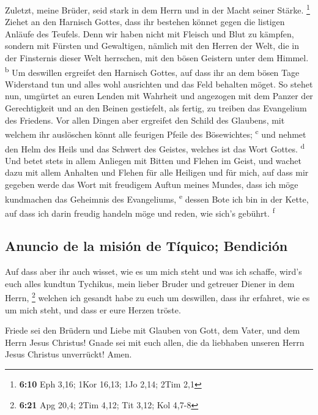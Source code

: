  Zuletzt, meine Brüder, seid stark in dem Herrn und in
der Macht seiner Stärke. \footnote{\textbf{6:10} Eph 3,16; 1Kor 16,13;
  1Jo 2,14; 2Tim 2,1}  Ziehet an den Harnisch Gottes,
dass ihr bestehen könnet gegen die listigen Anläufe des Teufels.
 Denn wir haben nicht mit Fleisch und Blut zu kämpfen,
sondern mit Fürsten und Gewaltigen, nämlich mit den Herren der Welt, die
in der Finsternis dieser Welt herrschen, mit den bösen Geistern unter
dem Himmel. \textsuperscript{b}  Um deswillen ergreifet
den Harnisch Gottes, auf dass ihr an dem bösen Tage Widerstand tun und
alles wohl ausrichten und das Feld behalten möget.  So
stehet nun, umgürtet an euren Lenden mit Wahrheit und angezogen mit dem
Panzer der Gerechtigkeit  und an den Beinen gestiefelt,
als fertig, zu treiben das Evangelium des Friedens.  Vor
allen Dingen aber ergreifet den Schild des Glaubens, mit welchem ihr
auslöschen könnt alle feurigen Pfeile des Bösewichtes;
\textsuperscript{c}  und nehmet den Helm des Heils und
das Schwert des Geistes, welches ist das Wort Gottes.
\textsuperscript{d}  Und betet stets in allem Anliegen
mit Bitten und Flehen im Geist, und wachet dazu mit allem Anhalten und
Flehen für alle Heiligen  und für mich, auf dass mir
gegeben werde das Wort mit freudigem Auftun meines Mundes, dass ich möge
kundmachen das Geheimnis des Evangeliums, \textsuperscript{e}
 dessen Bote ich bin in der Kette, auf dass ich darin
freudig handeln möge und reden, wie sich's gebührt. \textsuperscript{f}

\hypertarget{anuncio-de-la-misiuxf3n-de-tuxedquico-bendiciuxf3n}{%
\subsection{Anuncio de la misión de Tíquico;
Bendición}\label{anuncio-de-la-misiuxf3n-de-tuxedquico-bendiciuxf3n}}

 Auf dass aber ihr auch wisset, wie es um mich steht und
was ich schaffe, wird's euch alles kundtun Tychikus, mein lieber Bruder
und getreuer Diener in dem Herrn, \footnote{\textbf{6:21} Apg 20,4; 2Tim
  4,12; Tit 3,12; Kol 4,7-8}  welchen ich gesandt habe zu
euch um deswillen, dass ihr erfahret, wie es um mich steht, und dass er
eure Herzen tröste.

 Friede sei den Brüdern und Liebe mit Glauben von Gott,
dem Vater, und dem Herrn Jesus Christus!  Gnade sei mit
euch allen, die da liebhaben unseren Herrn Jesus Christus unverrückt!
Amen.
